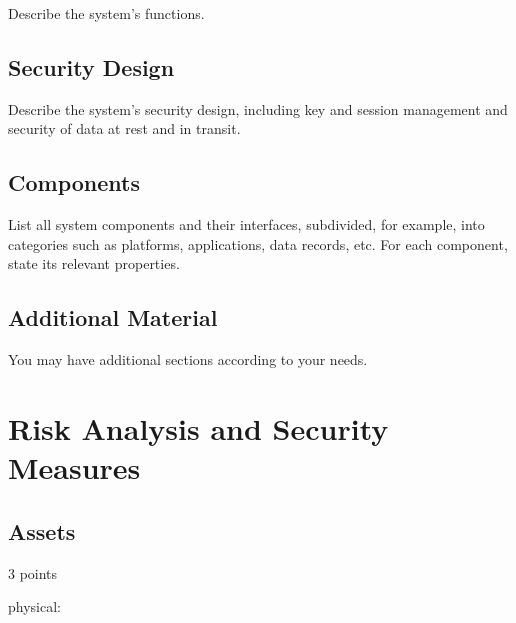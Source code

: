 \documentclass[english]{article}
\begin{document}
Describe the system's functions.


\subsection{Security Design}

Describe the system's security design, including key and session management and 
security of data at rest and in transit.


\subsection{Components}

List all system components and their interfaces, subdivided, for example, into
  categories such as platforms, applications, data records, etc. For
  each component, state its relevant properties.



\subsection{Additional Material}

You may have additional sections according to your needs.


\section{Risk Analysis and Security Measures}

\subsection{Assets}

3 points

physical:
\end{document}

